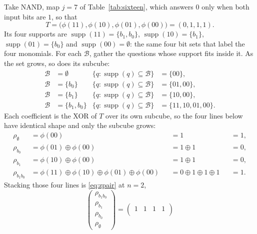 \documentclass[11pt]{article}
\begin{document}
\begin{example}
Take NAND, map $j = 7$ of Table~\ref{tab:sixteen}, which answers $0$
only when both input bits are $1$, so that
%
\begin{equation*}
  T = \big(\phi(11), \phi(10), \phi(01), \phi(00)\big) = (0,1,1,1).
\end{equation*}
Its four supports are $\operatorname{supp}(11) = \{b_1, b_0\}$,
$\operatorname{supp}(10) = \{b_1\}$,
$\operatorname{supp}(01) = \{b_0\}$ and
$\operatorname{supp}(00) = \emptyset$: the same four bit sets that
label the four monomials. For each $\mathcal B$, gather the questions
whose support fits inside it. As the set grows, so does its subcube:
%
\begin{align*}
  \mathcal B &= \emptyset &
    \{q : \operatorname{supp}(q) \subseteq \mathcal B\}
      &= \{00\}, \\
  \mathcal B &= \{b_0\} &
    \{q : \operatorname{supp}(q) \subseteq \mathcal B\}
      &= \{01, 00\}, \\
  \mathcal B &= \{b_1\} &
    \{q : \operatorname{supp}(q) \subseteq \mathcal B\}
      &= \{10, 00\}, \\
  \mathcal B &= \{b_1, b_0\} &
    \{q : \operatorname{supp}(q) \subseteq \mathcal B\}
      &= \{11, 10, 01, 00\} .
\end{align*}
%
Each coefficient is the XOR of $T$ over its own subcube, so the four
lines below have identical shape and only the subcube grows:
%
\begin{align*}
  \rho_\emptyset
    &= \phi(00)
    &&= 1
    &&= 1, \\
  \rho_{b_0}
    &= \phi(01) \oplus \phi(00)
    &&= 1 \oplus 1
    &&= 0, \\
  \rho_{b_1}
    &= \phi(10) \oplus \phi(00)
    &&= 1 \oplus 1
    &&= 0, \\
  \rho_{b_1 b_0}
    &= \phi(11) \oplus \phi(10) \oplus \phi(01) \oplus \phi(00)
    &&= 0 \oplus 1 \oplus 1 \oplus 1
    &&= 1 .
\end{align*}
%
Stacking those four lines is \eqref{eq:zpair} at $n = 2$,
%
\begin{equation*}
  \begin{pmatrix}
    \rho_{b_1 b_0} \\ \rho_{b_1} \\ \rho_{b_0} \\ \rho_\emptyset
  \end{pmatrix}
  =
  \begin{pmatrix}
    1 & 1 & 1 & 1 \\

\end{pmatrix}
\end{equation*}
\end{example}
\end{document}
